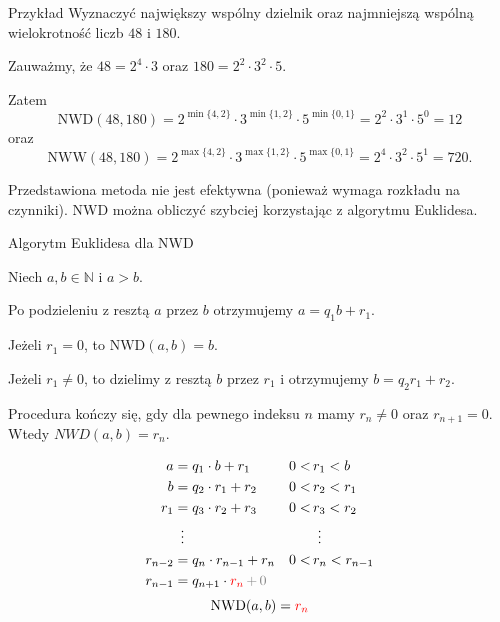 \documentclass[a4paper,10pt]{beamer}
\begin{document}
\begin{frame}
	
	\begin{exampleblock}{Przykład}
		Wyznaczyć największy wspólny dzielnik oraz najmniejszą wspólną wielokrotność liczb $48$ i $180$.
		
		Zauważmy, że $48=2^4\cdot3$ oraz $180=2^2\cdot3^2\cdot5$.
		
		Zatem $$\displaystyle\mbox{NWD}(48,180)=2^{\min\{4,2\}}\cdot3^{\min\{1,2\}}\cdot5^{\min\{0,1\}}=2^2\cdot3^1\cdot5^0=12$$
		oraz $$\displaystyle\mbox{NWW}(48,180)=2^{\max\{4,2\}}\cdot3^{\max\{1,2\}}\cdot5^{\max\{0,1\}}=2^4\cdot3^2\cdot5^1=720.$$
		
	\end{exampleblock}

Przedstawiona metoda nie jest efektywna (ponieważ wymaga rozkładu na czynniki). NWD można obliczyć szybciej korzystając z algorytmu Euklidesa.
	
\end{frame}

\begin{frame}{Algorytm Euklidesa dla NWD}
	
	\begin{block}{}
	
	Niech $a,b\in\mathbb{N}$ i $a>b$.
	
	Po podzieleniu z resztą $a$ przez $b$ otrzymujemy $a=q_1b+r_1$.
	
	Jeżeli $r_1=0$, to $\mbox{NWD}(a,b)=b$.
	
	Jeżeli $r_1\neq0$, to dzielimy z resztą $b$ przez $r_1$ i otrzymujemy $b=q_2r_1+r_2$.
	
	Procedura kończy się, gdy dla pewnego indeksu $n$ mamy $r_n\neq0$ oraz $r_{n+1}=0$. Wtedy $NWD(a,b)=r_n$.
	
	\end{block}

	\begin{align*}
		a&=q_1\cdot b+r_1&0<&\,r_1<b\\
		b&=q_2\cdot r_1+r_2&0<&\,r_2<r_1\\
		r_1&=q_3\cdot r_2+r_3&0<&\,r_3<r_2\\
		&\ \, \vdots&&\ \,\vdots\\
		r_{n-2}&=q_n\cdot r_{n-1}+r_n&0<&\,r_n<r_{n-1}\\
		r_{n-1}&=q_{n+1}\cdot \textcolor{red}{r_n}\,\textcolor{gray}{+\,0}&&
	\end{align*}
$$\mbox{NWD}(a,b)=\textcolor{red}{r_n}$$

\end{frame}
\end{document}
